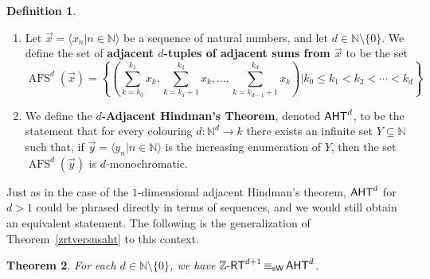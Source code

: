 \documentclass[10pt,a4paper]{amsart}
\newcommand{\zrt}{\mathnormal{\mathbb Z\text{-}\mathsf{RT}}}
\newcommand{\aht}{\mathnormal{\mathsf{AHT}}}
\newcommand{\weiseq}{\mathop{\equiv_{\mathrm{s}\mathsf{W}}}}
\DeclareMathOperator{\afs}{AFS}
\newtheorem{theorem}{Theorem}%
\theoremstyle{definition}
\newtheorem{definition}[theorem]{Definition}
\begin{document}
\begin{definition}\hfill
\begin{enumerate}
\item Let $\vec{x}=\langle x_n\big|n\in\mathbb N\rangle$ be a sequence of natural numbers, and let $d\in\mathbb N\setminus\{0\}$. We define the set of {\bf adjacent $d$-tuples of adjacent sums from $\vec{x}$} to be the set
\begin{equation*}
\afs^d(\vec{x})=\left\{\left(\sum_{k=k_0}^{k_1} x_k,\sum_{k=k_1+1}^{k_2} x_k,\ldots,\sum_{k=k_{d-1}+1}^{k_d} x_k\right)\bigg|k_0\leq k_1<k_2<\cdots<k_d\right\}
\end{equation*}
\item We define the {\bf $d$-Adjacent Hindman's Theorem}, denoted $\aht^d$, to be the statement that for every colouring $d:\mathbb N^d\longrightarrow k$ there exists an infinite set $Y\subseteq\mathbb N$ such that, if $\vec{y}=\langle y_n\big|n\in\mathbb N\rangle$ is the increasing enumeration of $Y$, then the set $\afs^d(\vec{y})$ is $d$-monochromatic.
\end{enumerate}
\end{definition}

Just as in the case of the $1$-dimensional adjacent Hindman's theorem, $\aht^d$ for $d>1$  could be phrased directly in terms of sequences, and we would still obtain an equivalent statement. The following is the generalization of Theorem~\ref{zrtversusaht} to this context.

\begin{theorem}\label{higher-zrtversusaht}
For each $d\in\mathbb N\setminus\{0\}$, we have $\zrt^{d+1}\weiseq\aht^d$.
\end{theorem}
\end{document}
